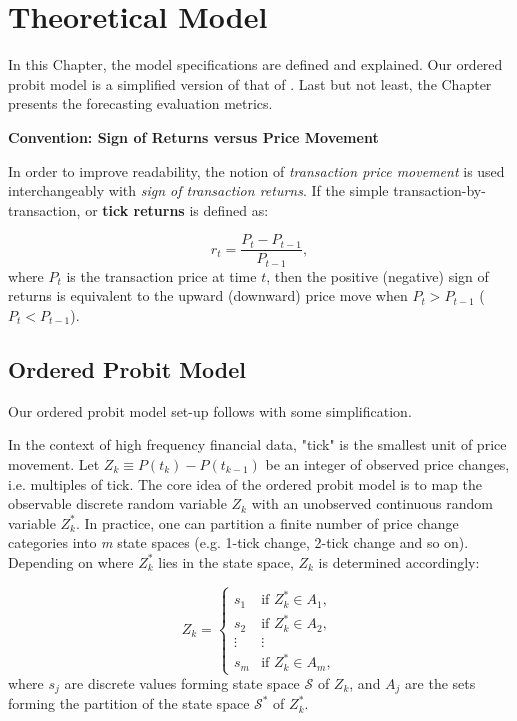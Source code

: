 \chapter{Theoretical Model}\label{chap:model}

In this Chapter, the model specifications are defined and explained. Our ordered probit model is a simplified version of that of \citet{hausman1992}. Last but not least, the Chapter presents the forecasting evaluation metrics.

\vspace{5mm}

{\noindent\bfseries Convention: Sign of Returns versus Price Movement}

In order to improve readability, the notion of \textit{transaction price movement} is used interchangeably with \textit{sign of transaction returns}. If the simple transaction-by-transaction, or \textbf{tick returns} is defined as:

\begin{equation}
    r_t = \frac{P_t - P_{t-1}}{P_{t-1}} ,
    \label{eq:1}
\end{equation}
where $P_t$ is the transaction price at time $t$, then the positive (negative) sign of returns is equivalent to the upward (downward) price move when \(P_t > P_{t-1}\) (\(P_t < P_{t-1}\)).

\section{Ordered Probit Model}

Our ordered probit model set-up follows \citet{hausman1992} with some simplification. 

In the context of high frequency financial data, "tick" is the smallest unit of price movement. Let $Z_k \equiv P(t_k) - P(t_{k-1})$ be an integer of observed price changes, i.e. multiples of tick. The core idea of the ordered probit model is to map the observable discrete random variable $Z_k$ with an unobserved continuous random variable $Z^*_k$. In practice, one can partition a finite number of price change categories into \textit{m} state spaces (e.g. 1-tick change, 2-tick change and so on). Depending on where $Z^*_k$ lies in the state space, $Z_k$ is determined accordingly:

\begin{equation}
Z_k =
\begin{cases}
s_1 & \text{if } Z_k^* \in A_1, \\
s_2 & \text{if } Z_k^* \in A_2, \\
\vdots & \vdots \\
s_m & \text{if } Z_k^* \in A_m,
\end{cases}
    \label{eq:2}
\end{equation}
where $s_j$ are discrete values forming state space \(\mathscr{S}\) of $Z_k$, and $A_j$ are the sets forming the partition of the state space \(\mathscr{S^*}\) of $Z^*_k$. 

